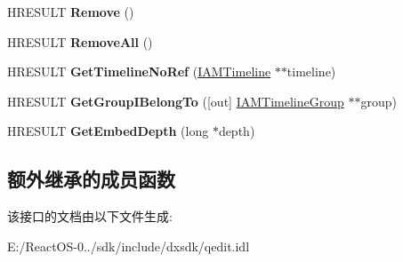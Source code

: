 \begin{DoxyCompactItemize}
H\+R\+E\+S\+U\+LT {\bfseries Remove} ()
\item 
\mbox{\label{interface_i_a_m_timeline_obj_a608a9ae6c66246382ec9e767cd616ab9}} 
H\+R\+E\+S\+U\+LT {\bfseries Remove\+All} ()
\item 
\mbox{\label{interface_i_a_m_timeline_obj_a64b3d73b25124edb3d5ad5120237c1e2}} 
H\+R\+E\+S\+U\+LT {\bfseries Get\+Timeline\+No\+Ref} (\hyperlink{interface_i_a_m_timeline}{I\+A\+M\+Timeline} $\ast$$\ast$timeline)
\item 
\mbox{\label{interface_i_a_m_timeline_obj_a630cbc1377a2d4fcaa5a8c30f7a548c1}} 
H\+R\+E\+S\+U\+LT {\bfseries Get\+Group\+I\+Belong\+To} (\mbox{[}out\mbox{]} \hyperlink{interface_i_a_m_timeline_group}{I\+A\+M\+Timeline\+Group} $\ast$$\ast$group)
\item 
\mbox{\label{interface_i_a_m_timeline_obj_ad936d2ab43f9f453ce274d42ab11668c}} 
H\+R\+E\+S\+U\+LT {\bfseries Get\+Embed\+Depth} (long $\ast$depth)
\end{DoxyCompactItemize}
\subsection*{额外继承的成员函数}


该接口的文档由以下文件生成\+:\begin{DoxyCompactItemize}
\item 
E\+:/\+React\+O\+S-\/0../sdk/include/dxsdk/qedit.\+idl\end{DoxyCompactItemize}
